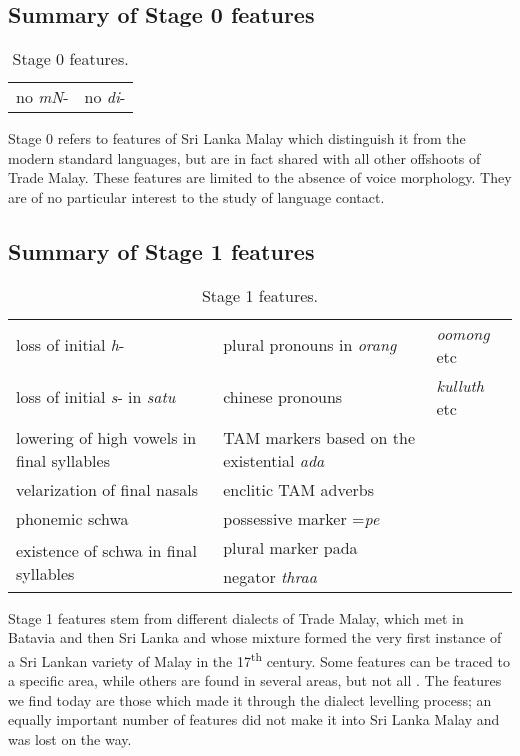 \subsection{Summary of Stage 0 features}

\begin{table}[h!]
\centering
\begin{tabular}{cc} 
no \emph{m\E{}N}- & 
no \emph{di}- 	 	\\ 
\end{tabular}
\caption{Stage 0 features.} 
\end{table}

Stage 0 refers to features of Sri Lanka Malay which distinguish it from the modern standard languages, but are in fact shared with all other offshoots of Trade Malay. These features are limited to the absence of voice morphology.
They are of no particular interest to the study of language contact.

\subsection{Summary of Stage 1 features}

\begin{table}[h!]
\centering
\begin{tabular}{p{4cm}p{4cm}p{4cm}} 
loss of initial \emph{h}- 		& plural pronouns in \emph{orang}	& \emph{oomong} etc\\
loss of initial \emph{s}- in \emph{satu} 	& chinese pronouns  	& \emph{kulluth} etc\\
lowering of high vowels in final syllables & TAM markers based on the
 existential \em ada\em  &  \\
velarization of final nasals	& enclitic TAM adverbs  &  \\
phonemic schwa      		&  possessive marker =\emph{pe}   &  \\
\multirow{2}{*}{existence of schwa in final syllables}	&   plural marker pada                       &  \\
& negator \emph{thraa} & \\ 
\end{tabular}
\caption{Stage 1 features.} 
\end{table}

Stage 1 features stem from different dialects of Trade Malay, which met in Batavia and then Sri Lanka and whose mixture formed the very first instance of a Sri Lankan variety of Malay in the 17\textsuperscript{th} century. Some features can be traced to a specific area, while others are found in several areas, but not all \citep{Paauwtv}. The features we find today are those which made it through the dialect levelling process; an equally important number of features did not make it into Sri Lanka Malay and was lost on the way.

